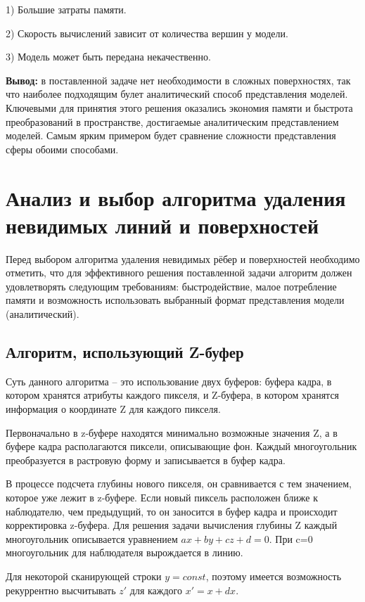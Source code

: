 	1) Большие затраты памяти.
	
	2) Скорость вычислений зависит от количества вершин у модели.
	
	3) Модель может быть передана некачественно.
		
	\textbf{Вывод:} в поставленной задаче нет необходимости в сложных поверхностях, так что наиболее подходящим булет аналитический способ представления моделей. Ключевыми для принятия этого решения оказались экономия памяти и быстрота преобразований в пространстве, достигаемые аналитическим представлением моделей. Самым ярким примером будет сравнение сложности представления сферы обоими способами.

	\section{Анализ и выбор алгоритма удаления невидимых линий и поверхностей}
	
	Перед выбором алгоритма удаления невидимых рёбер и поверхностей  необходимо отметить, что для эффективного решения поставленной задачи алгоритм должен удовлетворять следующим требованиям: быстродействие, малое потребление памяти и возможность использовать выбранный формат представления модели (аналитический).
	

\subsection{Алгоритм, использующий Z-буфер}

Суть данного алгоритма – это использование двух буферов: буфера кадра, в котором хранятся атрибуты каждого пикселя, и Z-буфера, в котором хранятся информация о координате Z для каждого пикселя.

Первоначально в z-буфере находятся минимально возможные значения Z, а в буфере кадра располагаются пиксели, описывающие фон. Каждый многоугольник преобразуется в растровую форму и записывается в буфер кадра.

В процессе подсчета глубины нового пикселя, он сравнивается с тем значением, которое уже лежит в z-буфере. Если новый пиксель расположен ближе к наблюдателю, чем предыдущий, то он заносится в буфер кадра и происходит корректировка z-буфера.
Для решения задачи вычисления глубины Z каждый многоугольник описывается уравнением $ax+by+cz+d=0$. При c=0 многоугольник для наблюдателя вырождается в линию.
 
Для некоторой сканирующей строки $y=const$, поэтому имеется возможность рекуррентно высчитывать $z'$ для каждого $x'=x+dx$.

